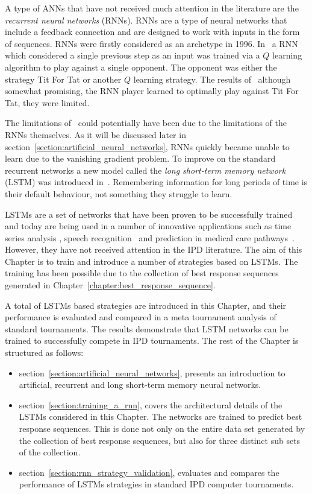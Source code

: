 A type of ANNs that have not received much attention in the literature are the
\textit{recurrent neural networks} (RNNs). RNNs are a type of neural networks
that include a feedback connection and are designed to work with inputs in
the form of sequences. RNNs were firstly considered as an archetype in 1996.
In~\cite{Sandholm1996} a RNN which considered a single previous step
as an input was trained via a \(Q\) learning algorithm to play against a single
opponent. The opponent was either the strategy Tit For Tat or another \(Q\)
learning strategy. The results of~\cite{Sandholm1996} although somewhat
promising, the RNN player learned to optimally play against Tit For Tat,
they were limited.

The limitations of~\cite{Sandholm1996} could potentially have been due to the
limitations of the RNNs themselves. As it will be discussed later in
section~\ref{section:artificial_neural_networks}, RNNs
quickly became unable to learn due to the vanishing gradient problem.
To improve on the standard recurrent networks a new model called the
\textit{long short-term memory network} (LSTM) was introduced in~\cite{Hochreiter1997}.
Remembering information for long periods of time is 
their default behaviour, not something they struggle to learn.

LSTMs are a set of networks that have been proven to be successfully trained and
today are being used in a number of innovative applications such as time series
analysis \cite{Malhotra2015}, speech recognition~\cite{Sak2014} and prediction
in medical care pathways~\cite{Wang2018_lstm}. However, they have not received
attention in the IPD literature. The aim of this Chapter is to train and
introduce a number of strategies based on LSTMs. The training has been possible
due to the collection of best response sequences generated in
Chapter~\ref{chapter:best_response_sequence}.

A total of \lstmstrategies LSTMs based strategies are introduced in this
Chapter, and their performance is evaluated and compared in a meta tournament
analysis of \metatournamentslstm standard tournaments. The results demonstrate
that LSTM networks can be trained to successfully compete in IPD tournaments.
The rest of the Chapter is structured as follows:

\begin{itemize}
    \item section~\ref{section:artificial_neural_networks}, presents an
    introduction to artificial, recurrent and long short-term memory neural networks.
    \item section~\ref{section:training_a_rnn}, covers the architectural details
    of the LSTMs considered in this Chapter. The networks are trained to predict
    best response sequences. This is done not only on the entire data set
    generated by the collection of best response sequences, but also for three
    distinct sub sets of the collection.
    \item section~\ref{section:rnn_strategy_validation}, evaluates and compares
    the performance of \lstmstrategies LSTMs strategies in
    \metatournamentslstm standard IPD computer tournaments.
\end{itemize}

